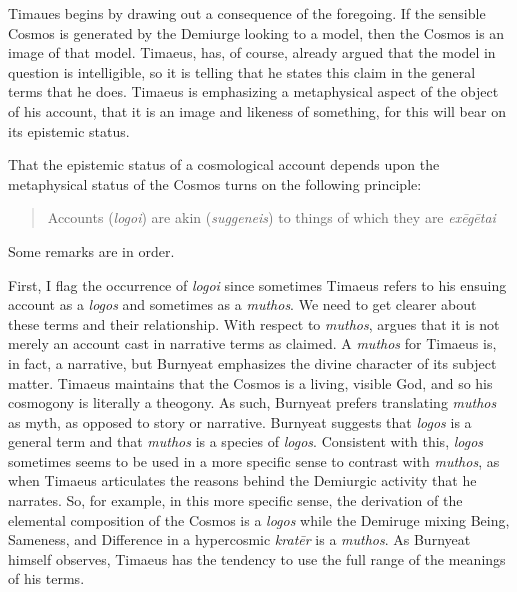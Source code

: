 Timaues begins by drawing out a consequence of the foregoing. If the sensible Cosmos is generated by the Demiurge looking to a model, then the Cosmos is an image of that model. Timaeus, has, of course, already argued that the model in question is intelligible, so it is telling that he states this claim in the general terms that he does. Timaeus is emphasizing a metaphysical aspect of the object of his account, that it is an image and likeness of something, for this will bear on its epistemic status.

That the epistemic status of a cosmological account depends upon the metaphysical status of the Cosmos turns on the following principle:
\begin{quote}
	Accounts (\emph{logoi}) are akin (\emph{suggeneis}) to things of which they are \emph{exēgētai}
\end{quote}
Some remarks are in order.

First, I flag the occurrence of \emph{logoi} since sometimes Timaeus refers to his ensuing account as a \emph{logos} and sometimes as a \emph{muthos}. We need to get clearer about these terms and their relationship. With respect to \emph{muthos}, \citet[144--5]{Burnyeat:2005it} argues that it is not merely an account cast in narrative terms as \citet[71--3]{Vlastos:1939td} claimed. A \emph{muthos} for Timaeus is, in fact, a narrative, but Burnyeat emphasizes the divine character of its subject matter. Timaeus maintains that the Cosmos is a living, visible God, and so his cosmogony is literally a theogony. As such, Burnyeat prefers translating \emph{muthos} as myth, as opposed to story or narrative. Burnyeat suggests that \emph{logos} is a general term and that \emph{muthos} is a species of \emph{logos}. Consistent with this, \emph{logos} sometimes seems to be used in a more specific sense to contrast with \emph{muthos}, as when Timaeus articulates the reasons behind the Demiurgic activity that he narrates. So, for example, in this more specific sense, the derivation of the elemental composition of the Cosmos is a \emph{logos} while the Demiruge mixing Being, Sameness, and Difference in a hypercosmic \emph{kratēr} is a \emph{muthos}. As Burnyeat himself observes, Timaeus has the tendency to use the full range of the meanings of his terms.

